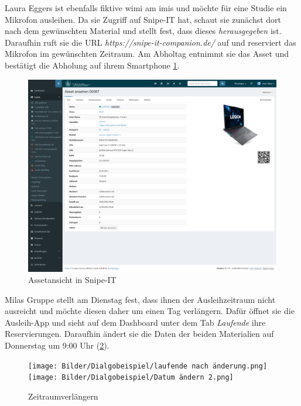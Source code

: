 \newpage
Laura Eggers ist ebenfalls fiktive \ac{wimi} am \ac{imis} und möchte für eine
Studie ein Mikrofon ausleihen. Da sie Zugriff auf Snipe-IT hat, schaut sie
zunächst dort nach dem gewünschten Material und stellt fest, dass dieses
\textit{herausgegeben} ist. Daraufhin ruft sie die URL
\textit{https://snipe-it-companion.de/} auf und reserviert das Mikrofon im
gewünschten Zeitraum. Am Abholtag entnimmt sie das Asset und bestätigt die
Abholung auf ihrem Smartphone \ref{fig:georg5}. 
\begin{figure}[h]
    \centering
    \includegraphics[scale=0.17]{Bilder/Screenshot 2022-10-14 at 11-26-25 Asset ansehen 00087 Ausleihmanagement.png}
    \caption[Assetansicht in Snipe-IT]{Assetansicht in Snipe-IT}\label{fig:georg5}
\end{figure}


Milas Gruppe stellt am Dienstag fest, dass ihnen der Ausleihzeitraum nicht ausreicht und möchte
diesen daher um einen Tag verlängern. Dafür öffnet sie die Ausleih-App und sieht auf dem Dashboard
unter dem Tab \textit{Laufende} ihre Reservierungen. Daraufhin ändert sie die Daten der beiden
Materialien auf Donnerstag um 9:00 Uhr (\ref{fig:andern}). 
\begin{figure}[h]
    \centering
    \texttt{[image: Bilder/Dialgobeispiel/laufende nach änderung.png]}\hspace{1em}
    \texttt{[image: Bilder/Dialgobeispiel/Datum ändern 2.png]}\hspace{1em}
    \caption[Dialogbeispiel 3]{Zeitraumverlängern}\label{fig:andern}
\end{figure}

